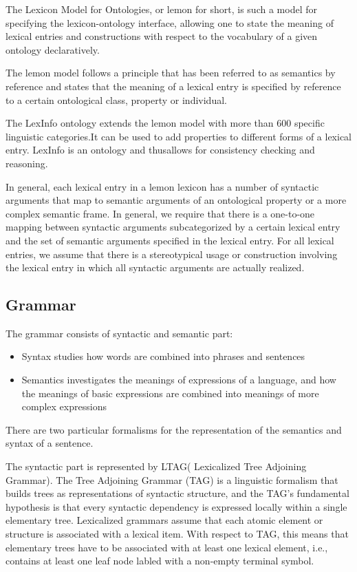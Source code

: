 The Lexicon Model for Ontologies, or lemon for short, is such a model for specifying the lexicon-ontology interface, allowing one to state the meaning of lexical entries and constructions with respect to the vocabulary of a given ontology declaratively.

The lemon model follows a principle that has been referred to as semantics by reference and states that the meaning of a lexical entry is specified by reference to a certain ontological class, property or individual.

The LexInfo ontology extends the lemon model with more than 600 specific linguistic categories.It can be used to add properties to different forms of a lexical entry. LexInfo is an ontology and thusallows for consistency checking and reasoning. 

In general, each lexical entry in a lemon lexicon has a number of syntactic arguments that map to semantic arguments of an ontological property or a more complex semantic frame. In general, we require that there is a one-to-one mapping between syntactic arguments subcategorized by a certain lexical entry and the set of semantic arguments specified in the lexical entry. For all lexical entries, we assume that there is a stereotypical usage or construction involving the lexical entry in which all syntactic arguments are actually realized.

\subsection{Grammar}
The grammar consists of syntactic and semantic part:
\begin{itemize} 
  \item Syntax studies how words are combined into phrases and sentences
  \item Semantics investigates the meanings of expressions of a language, and how the meanings of basic expressions are combined into meanings of more complex expressions
\end{itemize} 
There are two particular formalisms for the representation of the semantics and syntax of a sentence.

The syntactic part is represented by LTAG( Lexicalized Tree Adjoining Grammar).  
The Tree Adjoining Grammar (TAG) is a linguistic formalism that builds trees as representations of syntactic structure, and the TAG's fundamental hypothesis is that every syntactic dependency is expressed locally within a single elementary tree. Lexicalized grammars assume that each atomic element or structure is associated with a lexical item. With respect to TAG, this means that elementary trees have to be associated with at least one lexical element, i.e., contains at least one leaf node labled with a non-empty terminal symbol.

